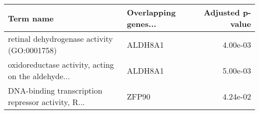 \begin{tabular}{llr}
\toprule
                                         Term name & Overlapping genes... &  Adjusted p-value \\
\midrule
       retinal dehydrogenase activity (GO:0001758) &              ALDH8A1 &          4.00e-03 \\
oxidoreductase activity, acting on the aldehyde... &              ALDH8A1 &          5.00e-03 \\
DNA-binding transcription repressor activity, R... &                ZFP90 &          4.24e-02 \\
\bottomrule
\end{tabular}
